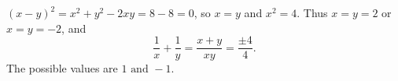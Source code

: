 $(x-y)^2=x^2+y^2-2xy=8-8=0$, so $x=y$ and $x^2=4$. Thus $x=y=2$ or $x=y=-2$, and
\[\dfrac1x+\dfrac1y=\dfrac{x+y}{xy}=\dfrac{\pm4}{4}.\]
The possible values are $\boxed{1\text{ and }-1}$.
